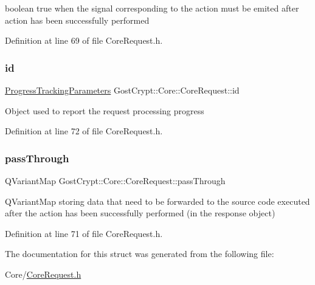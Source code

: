 boolean true when the signal corresponding to the action must be emited after action has been successfully performed 

Definition at line 69 of file Core\+Request.\+h.

\mbox{\label{struct_gost_crypt_1_1_core_1_1_core_request_adf72d60e06f395bc4bc09a00c981b734}} 
\subsubsection{\texorpdfstring{id}{id}}
{\footnotesize\ttfamily \hyperlink{struct_gost_crypt_1_1_core_1_1_progress_tracking_parameters}{Progress\+Tracking\+Parameters} Gost\+Crypt\+::\+Core\+::\+Core\+Request\+::id}

Object used to report the request processing progress 

Definition at line 72 of file Core\+Request.\+h.

\mbox{\label{struct_gost_crypt_1_1_core_1_1_core_request_a50bfb2598940d867992ec364f37d57ec}} 
\subsubsection{\texorpdfstring{pass\+Through}{passThrough}}
{\footnotesize\ttfamily Q\+Variant\+Map Gost\+Crypt\+::\+Core\+::\+Core\+Request\+::pass\+Through}

Q\+Variant\+Map storing data that need to be forwarded to the source code executed after the action has been successfully performed (in the response object) 

Definition at line 71 of file Core\+Request.\+h.



The documentation for this struct was generated from the following file\+:\begin{DoxyCompactItemize}
\item 
Core/\hyperlink{_core_request_8h}{Core\+Request.\+h}\end{DoxyCompactItemize}
